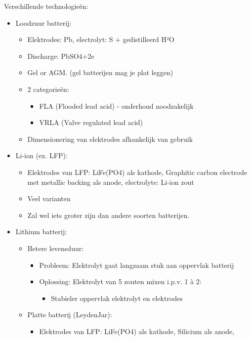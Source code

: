 \documentclass[12pt]{article}
\begin{document}
Verschillende technologieën:\begin{itemize}
    \item Loodzuur batterij:\begin{itemize}
        \item Elektrodes: Pb, electrolyt: S + gedistilleerd H²O
        \item Discharge: PbSO4+2e
        \item Gel or AGM. (gel batterijen mag je plat leggen)
        \item 2 categorieën:\begin{itemize}
            \item FLA (Flooded lead acid) - onderhoud noodzakelijk
            \item VRLA (Valve regulated lead acid)
        \end{itemize}
        \item Dimensionering van elektrodes afhankelijk van gebruik
    \end{itemize}
    \item Li-ion (ex. LFP):\begin{itemize}
        \item Elektrodes van LFP: LiFe(PO4) als kathode, Graphitic carbon
        electrode met metallic backing als anode, electrolyte: Li-ion zout
        \item Veel varianten
        \item Zal wel iets groter zijn dan andere soorten batterijen.
    \end{itemize}
    \item Lithium batterij:\begin{itemize}
        \item Betere levensduur:\begin{itemize}
            \item Probleem: Elektrolyt gaat langzaam stuk aan oppervlak batterij 
            \item Oplossing: Elektrolyt van 5 zouten mixen i.p.v. 1 à 2:\begin{itemize}
                \item Stabieler oppervlak elektrolyt en elektrodes
            \end{itemize}
        \end{itemize}
        \item Platte batterij (LeydenJar):\begin{itemize}
            \item Elektrodes van LFP: LiFe(PO4) als kathode, Silicium als anode,

\end{itemize}
\end{itemize}
\end{itemize}
\end{document}
